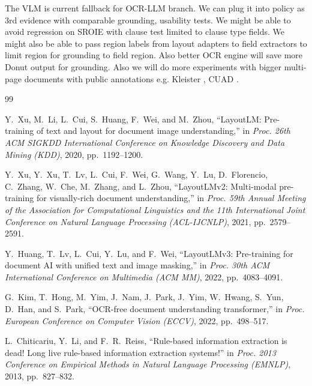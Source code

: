 \documentclass[conference]{IEEEtran}
\begin{document}
The VLM is current fallback for OCR-LLM branch. We can plug it into policy as 3rd evidence with comparable grounding, usability tests. We might be able to avoid regression on SROIE with clause test limited to clause type fields. We might also be able to pass region labels from layout adapters to field extractors to limit region for grounding to field region. Also better OCR engine will save more Donut output for grounding. Also we will do more experiments with bigger multi-page documents with public annotations e.g. Kleister \cite{stanislawek2021kleister}, CUAD \cite{cuad2021}.


\begin{thebibliography}{99}

Y.~Xu, M.~Li, L.~Cui, S.~Huang, F.~Wei, and M.~Zhou,
``LayoutLM: Pre-training of text and layout for document image
understanding,''
in \textit{Proc. 26th ACM SIGKDD International Conference on
Knowledge Discovery and Data Mining (KDD)}, 2020,
pp.~1192--1200.

Y.~Xu, Y.~Xu, T.~Lv, L.~Cui, F.~Wei, G.~Wang, Y.~Lu,
D.~Florencio, C.~Zhang, W.~Che, M.~Zhang, and L.~Zhou,
``LayoutLMv2: Multi-modal pre-training for visually-rich document
understanding,''
in \textit{Proc. 59th Annual Meeting of the Association for
Computational Linguistics and the 11th International Joint Conference
on Natural Language Processing (ACL-IJCNLP)}, 2021,
pp.~2579--2591.

Y.~Huang, T.~Lv, L.~Cui, Y.~Lu, and F.~Wei,
``LayoutLMv3: Pre-training for document AI with unified text and
image masking,''
in \textit{Proc. 30th ACM International Conference on Multimedia
(ACM MM)}, 2022, pp.~4083--4091.

G.~Kim, T.~Hong, M.~Yim, J.~Nam, J.~Park, J.~Yim,
W.~Hwang, S.~Yun, D.~Han, and S.~Park,
``OCR-free document understanding transformer,''
in \textit{Proc. European Conference on Computer Vision (ECCV)},
2022, pp.~498--517.

L.~Chiticariu, Y.~Li, and F.~R.~Reiss,
``Rule-based information extraction is dead! Long live rule-based
information extraction systems!''
in \textit{Proc. 2013 Conference on Empirical Methods in Natural
Language Processing (EMNLP)}, 2013, pp.~827--832.


\end{thebibliography}
\end{document}

